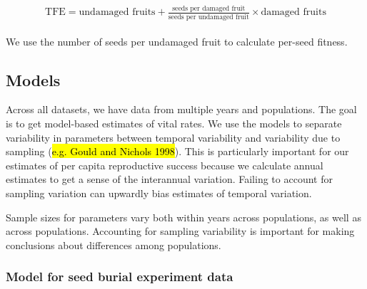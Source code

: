 \documentclass[12pt, oneside, titlepage]{article}   	%
\begin{document}
%
    \begin{align}
\begin{split}
\textrm{TFE} = \textrm{undamaged fruits} + \frac{\textrm{seeds per damaged fruit}}{\textrm{seeds per undamaged fruit}}\times  \textrm{damaged fruits} 
  \end{split}
\end{align}
%

We use the number of seeds per undamaged fruit to calculate per-seed fitness. 

\subsection*{Models}

Across all datasets, we have data from multiple years and populations. The goal is to get model-based estimates of vital rates. We use the models to separate variability in parameters between temporal variability and variability due to sampling (\hl{e.g. Gould and Nichols 1998}). This is particularly important for our estimates of per capita reproductive success because we calculate annual estimates to get a sense of the interannual variation. Failing to account for sampling variation can upwardly bias estimates of temporal variation. 

Sample sizes for parameters vary both within years across populations, as well as across populations. Accounting for sampling variability is important for making conclusions about differences among populations. 
 
\subsubsection*{Model for seed burial experiment data}
\end{document}
